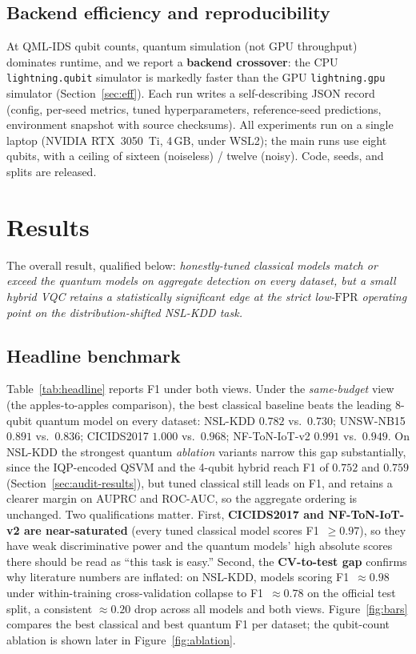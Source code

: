 \documentclass[preprint,11pt]{elsarticle}
\newcommand{\fpr}{\mathrm{FPR}}
\begin{document}
\subsection{Backend efficiency and reproducibility}
At QML-IDS qubit counts, quantum simulation (not GPU throughput) dominates runtime, and we report a
\textbf{backend crossover}: the CPU \texttt{lightning.qubit} simulator is markedly faster than the GPU
\texttt{lightning.gpu} simulator (Section~\ref{sec:eff}). Each run writes a self-describing JSON record
(config, per-seed metrics, tuned hyperparameters, reference-seed predictions, environment snapshot with
source checksums). All experiments run on a single laptop (NVIDIA RTX~3050~Ti, 4\,GB, under WSL2); the
main runs use eight qubits, with a ceiling of sixteen (noiseless) / twelve (noisy). Code, seeds, and
splits are released.

\section{Results}
The overall result, qualified below: \emph{honestly-tuned classical models match or exceed the quantum
models on aggregate detection on every dataset, but a small hybrid VQC retains a statistically
significant edge at the strict low-$\fpr$ operating point on the distribution-shifted NSL-KDD task.}

\subsection{Headline benchmark}
Table~\ref{tab:headline} reports F1 under both views. Under the \emph{same-budget} view (the
apples-to-apples comparison), the best classical baseline beats the leading 8-qubit quantum model on
every dataset: NSL-KDD $0.782$ vs.\ $0.730$; UNSW-NB15 $0.891$ vs.\ $0.836$; CICIDS2017 $1.000$ vs.\
$0.968$; NF-ToN-IoT-v2 $0.991$ vs.\ $0.949$. On NSL-KDD the strongest quantum \emph{ablation} variants
narrow this gap substantially, since the IQP-encoded QSVM and the 4-qubit hybrid reach F1 of $0.752$ and
$0.759$ (Section~\ref{sec:audit-results}), but tuned classical still leads on F1, and retains a clearer
margin on AUPRC and ROC-AUC, so the aggregate ordering is unchanged. Two qualifications
matter. First, \textbf{CICIDS2017 and NF-ToN-IoT-v2 are near-saturated} (every tuned classical model
scores F1~$\geq 0.97$), so they have weak discriminative power and the quantum models' high absolute
scores there should be read as ``this task is easy.'' Second, the \textbf{CV-to-test gap} confirms why
literature numbers are inflated: on NSL-KDD, models scoring F1~$\approx 0.98$ under within-training
cross-validation collapse to F1~$\approx 0.78$ on the official test split, a consistent $\approx 0.20$
drop across all models and both views. Figure~\ref{fig:bars} compares the best classical and best
quantum F1 per dataset; the qubit-count ablation is shown later in Figure~\ref{fig:ablation}.
\end{document}
